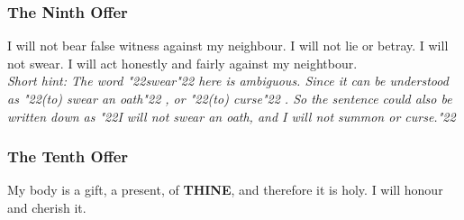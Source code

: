\documentclass[12pt,a4paper]{article}
\newcommand{\Thine}[0]{\textbf{THINE}}
\newcommand{\q}[1]{\char"22{#1}\char"22 }
\begin{document}
	\subsubsection{The Ninth Offer} \label{TheNinthOffer}
		I will not bear false witness against my neighbour.
		I will not lie or betray.
		I will not swear.
		I will act honestly and fairly against my neightbour.
		\\
		\textit{Short hint:
		The word \q{swear} here is ambiguous.
		Since it can be understood as \q{(to) swear an oath},
		or \q{(to) curse}.
		So the sentence could also be written down as
		\q{I will not swear an oath, and I will not summon or curse.}}
		
	\subsubsection{The Tenth Offer} \label{TheTenthOffer}
		My body is a gift, a present, of {\Thine},
		and therefore it is holy.
		I will honour and cherish it.
	
\end{document}

